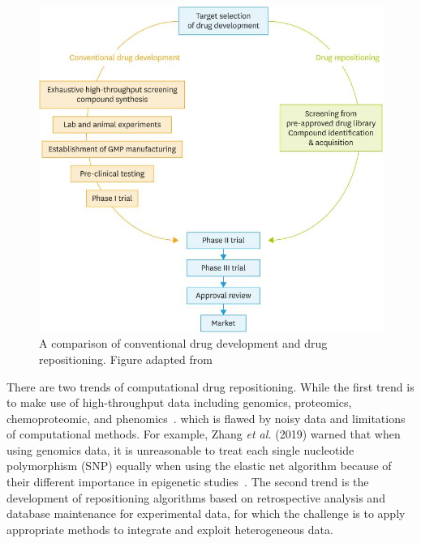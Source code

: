 \begin{figure}[!h]
    \centering
    \includegraphics[scale=0.35]
    {figures/drug_repo_process.png}
    \captionsetup{justification=centering}
    \caption [A comparison of conventional drug development and drug repositioning]{\label{fig:drug_repo_process} A comparison of conventional drug development and drug repositioning. Figure adapted from~\cite{kobayashi_current_2019}}
\end{figure}

There are two trends of computational drug repositioning. While the first trend is to make use of high-throughput data including genomics, proteomics, chemoproteomic, and phenomics~\cite{park_review_2019}. which is flawed by noisy data and limitations of computational methods. For example, Zhang \textit{et al.} (2019) warned that when using genomics data, it is unreasonable to treat each single nucleotide polymorphism (SNP) equally when using the elastic net algorithm because of their different importance in epigenetic studies~\cite{dai_survey_2015}. The second trend is the development of repositioning algorithms based on retrospective analysis and database maintenance for experimental data, for which the challenge is to apply appropriate methods to integrate and exploit heterogeneous data.

